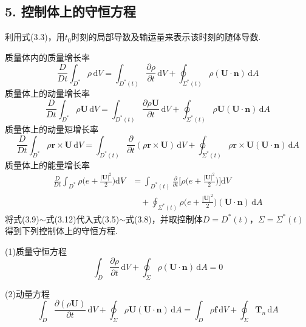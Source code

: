 \subsection*{5. 控制体上的守恒方程}

利用式(3.3)，用$t_0$时刻的局部导数及输运量来表示该时刻的随体导数.

质量体内的质量增长率
\begin{equation*}
\frac{D}{Dt}\int_{D^{*}}\rho\,\mathrm{d}V=\int_{D^{*}(t)}\frac{\partial\rho}{\partial t}\,\mathrm{d}V+\oint_{\Sigma^{*}(t)}\rho(\boldsymbol{U}\cdot\boldsymbol{n})\,\mathrm{d}A
\tag{3.9}
\end{equation*}
质量体上的动量增长率
\begin{equation*}
\frac{D}{Dt}\int_{D^{*}}\rho\boldsymbol{U}\,\mathrm{d}V=\int_{D^{*}(t)}\frac{\partial\rho\boldsymbol{U}}{\partial t}\,\mathrm{d}V+\oint_{\Sigma^{*}(t)}\rho\boldsymbol{U}(\boldsymbol{U}\cdot\boldsymbol{n})\,\mathrm{d}A
\tag{3.10}
\end{equation*}
质量体上的动量矩增长率
\begin{equation*}
\frac{D}{Dt}\int_{D^{*}}\rho\boldsymbol{r}\times\boldsymbol{U}\,\mathrm{d}V=\int_{D^{*}(t)}\frac{\partial}{\partial t}(\rho\boldsymbol{r}\times\boldsymbol{U})\,\mathrm{d}V+\oint_{\Sigma^{*}(t)}\rho\boldsymbol{r}\times\boldsymbol{U}(\boldsymbol{U}\cdot\boldsymbol{n})\,\mathrm{d}A
\tag{3.11}
\end{equation*}
质量体上的能量增长率
\begin{align*}
\frac{D}{Dt}\int_{D^{*}}\rho\Big(e+\frac{|\boldsymbol{U}|^{2}}{2}\Big)\mathrm{d}V&=\int_{D^{*}(t)}\frac{\partial}{\partial t}\Big[\rho\Big(e+\frac{|\boldsymbol{U}|^{2}}{2}\Big)\Big]\mathrm{d}V\\
&\quad+\oint_{\Sigma^{*}(t)}\rho\Big(e+\frac{|\boldsymbol{U}|^{2}}{2}\Big)(\boldsymbol{U}\cdot\boldsymbol{n})\,\mathrm{d}A
\tag{3.12}
\end{align*}
将式(3.9)$\sim$式(3.12)代入式(3.5)$\sim$式(3.8)，并取控制体$D=D^{*}(t)$，$\Sigma=\Sigma^{*}(t)$得到下列控制体上的守恒方程.

(1)质量守恒方程
\begin{equation*}
\int_D \frac{\partial\rho}{\partial t}\,\mathrm{d}V+\oint_\Sigma \rho(\boldsymbol{U}\cdot\boldsymbol{n})\,\mathrm{d}A=0
\tag{3.13}
\end{equation*}

(2)动量方程
\begin{equation*}
\int_D \frac{\partial(\rho\boldsymbol{U})}{\partial t}\,\mathrm{d}V+\oint_\Sigma \rho\boldsymbol{U}(\boldsymbol{U}\cdot\boldsymbol{n})\,\mathrm{d}A=\int_D \rho\boldsymbol{f}\,\mathrm{d}V+\oint_\Sigma \boldsymbol{T}_n\,\mathrm{d}A
\tag{3.14}
\end{equation*}


